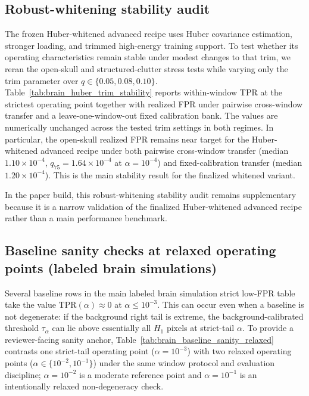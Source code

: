 \subsection{Robust-whitening stability audit}
\label{app:brain-huber-trim-stability}
\ifSTAPSUPPLEMENTONLY
The frozen Huber-whitened advanced recipe uses Huber covariance estimation, stronger loading, and trimmed high-energy training support. To test whether its operating characteristics remain stable under modest changes to that trim, we reran the open-skull and structured-clutter stress tests while varying only the trim parameter over $q\in\{0.05,0.08,0.10\}$. Table~\ref{tab:brain_huber_trim_stability} reports within-window TPR at the strictest operating point together with realized FPR under pairwise cross-window transfer and a leave-one-window-out fixed calibration bank.
\noindent The values are numerically unchanged across the tested trim settings in both regimes. In particular, the open-skull realized FPR remains near target for the Huber-whitened advanced recipe under both pairwise cross-window transfer (median $1.10\times 10^{-4}$, $q_{75}=1.64\times 10^{-4}$ at $\alpha=10^{-4}$) and fixed-calibration transfer (median $1.20\times 10^{-4}$). This is the main stability result for the finalized whitened variant.

\else
\noindent In the paper build, this robust-whitening stability audit remains supplementary because it is a narrow validation of the finalized Huber-whitened advanced recipe rather than a main performance benchmark.
\fi

\subsection{Baseline sanity checks at relaxed operating points (labeled brain simulations)}
\label{app:brain-baseline-sanity-relaxed}
\ifSTAPSUPPLEMENTONLY
Several baseline rows in the main labeled brain simulation strict low-FPR table take the value $\mathrm{TPR}(\alpha)\approx 0$ at $\alpha\le 10^{-3}$. This can occur even when a baseline is not degenerate: if the background right tail is extreme, the background-calibrated threshold $\tau_\alpha$ can lie above essentially all $H_1$ pixels at strict-tail $\alpha$.
To provide a reviewer-facing sanity anchor, Table~\ref{tab:brain_baseline_sanity_relaxed} contrasts one strict-tail operating point ($\alpha=10^{-3}$) with two relaxed operating points ($\alpha\in\{10^{-2},10^{-1}\}$) under the same window protocol and evaluation discipline; $\alpha=10^{-2}$ is a moderate reference point and $\alpha=10^{-1}$ is an intentionally relaxed non-degeneracy check.

